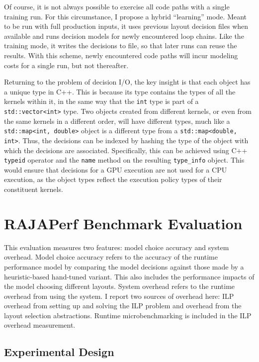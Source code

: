 Of course, it is not always possible to exercise all code paths with a single training run. 
For this circumstance, I propose a hybrid ``learning'' mode.
Meant to be run with full production inputs, it uses previous layout decision files when available and runs decision models for newly encountered loop chains.
Like the training mode, it writes the decisions to file, so that later runs can reuse the results.
With this scheme, newly encountered code paths will incur modeling costs for a single run, but not thereafter.

Returning to the problem of decision I/O, the key insight is that each \FormatDecisions{} object has a unique type in C++.
This is because its type contains the types of all the kernels within it, in the same way that the \verb.int. type is part of a \verb.std::vector<int>. type.
Two \FormatDecisions{} objects created from different kernels, or even from the same kernels in a different order, will have different types, much like a \verb.std::map<int, double>. object is a different type from a \verb.std::map<double, int>..
Thus, the decisions can be indexed by hashing the type of the \FormatDecisions{} object with which the decisions are associated.
Specifically, this can be achieved using C++ \verb.typeid. operator and the \verb.name. method on the resulting \verb.type_info. object.
This would ensure that decisions for a GPU execution are not used for a CPU execution, as the \FormatDecisions{} object types reflect the execution policy types of their constituent kernels.


\section{RAJAPerf Benchmark Evaluation}

This evaluation measures two features: model choice accuracy and system overhead.
Model choice accuracy refers to the accuracy of the runtime performance model by comparing the model decisions against those made by a heuristic-based hand-tuned variant.
This also includes the performance impacts of the model choosing different layouts.
System overhead refers to the runtime overhead from using the \FormatDecisions{} system.
I report two sources of overhead here: ILP overhead from setting up and solving the ILP problem and overhead from the layout selection abstractions.
Runtime microbenchmarking is included in the ILP overhead measurement.

\subsection{Experimental Design}

